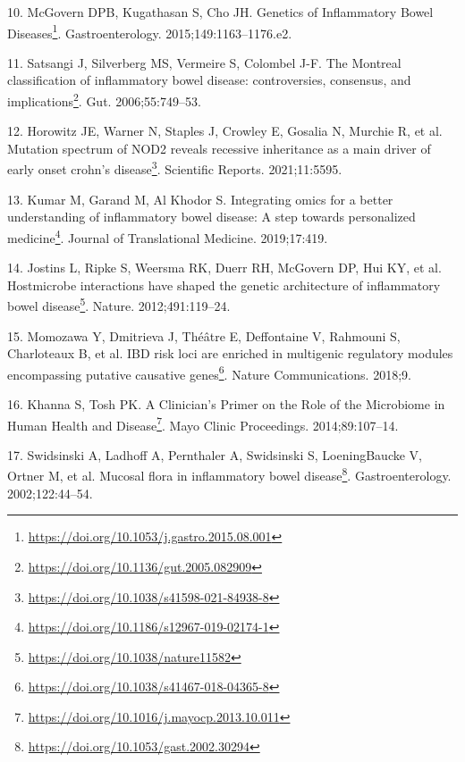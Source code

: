 \documentclass[
  12pt,
  a4paper,
  twoside,
  openright]{book}
\DeclareRobustCommand{\href}[2]{#2\footnote{\url{#1}}}
\newlength{\cslhangindent}
\newlength{\cslentryspacingunit} %
\newenvironment{CSLReferences}[2] %
 {%
  \setlength{\parindent}{0pt}
  \ifodd #1
  \let\oldpar\par
  \def\par{\hangindent=\cslhangindent\oldpar}
  \fi
  \setlength{\parskip}{#2\cslentryspacingunit}
 }%
 {}
\begin{document}
\begin{CSLReferences}{0}{0}
\leavevmode{}%
10. McGovern DPB, Kugathasan S, Cho JH. \href{https://doi.org/10.1053/j.gastro.2015.08.001}{Genetics of Inflammatory Bowel Diseases}. Gastroenterology. 2015;149:1163--1176.e2.

\leavevmode{}%
11. Satsangi J, Silverberg MS, Vermeire S, Colombel J-F. \href{https://doi.org/10.1136/gut.2005.082909}{The Montreal classification of inflammatory bowel disease: controversies, consensus, and implications}. Gut. 2006;55:749--53.

\leavevmode{}%
12. Horowitz JE, Warner N, Staples J, Crowley E, Gosalia N, Murchie R, et al. \href{https://doi.org/10.1038/s41598-021-84938-8}{Mutation spectrum of NOD2 reveals recessive inheritance as a main driver of early onset crohn{'}s disease}. Scientific Reports. 2021;11:5595.

\leavevmode{}%
13. Kumar M, Garand M, Al Khodor S. \href{https://doi.org/10.1186/s12967-019-02174-1}{Integrating omics for a better understanding of inflammatory bowel disease: A step towards personalized medicine}. Journal of Translational Medicine. 2019;17:419.

\leavevmode{}%
14. Jostins L, Ripke S, Weersma RK, Duerr RH, McGovern DP, Hui KY, et al. \href{https://doi.org/10.1038/nature11582}{Host{\textendash}microbe interactions have shaped the genetic architecture of inflammatory bowel disease}. Nature. 2012;491:119--24.

\leavevmode{}%
15. Momozawa Y, Dmitrieva J, Théâtre E, Deffontaine V, Rahmouni S, Charloteaux B, et al. \href{https://doi.org/10.1038/s41467-018-04365-8}{IBD risk loci are enriched in multigenic regulatory modules encompassing putative causative genes}. Nature Communications. 2018;9.

\leavevmode{}%
16. Khanna S, Tosh PK. \href{https://doi.org/10.1016/j.mayocp.2013.10.011}{A Clinician's Primer on the Role of the Microbiome in Human Health and Disease}. Mayo Clinic Proceedings. 2014;89:107--14.

\leavevmode{}%
17. Swidsinski A, Ladhoff A, Pernthaler A, Swidsinski S, LoeningBaucke V, Ortner M, et al. \href{https://doi.org/10.1053/gast.2002.30294}{Mucosal flora in inflammatory bowel disease}. Gastroenterology. 2002;122:44--54.


\end{CSLReferences}
\end{document}
